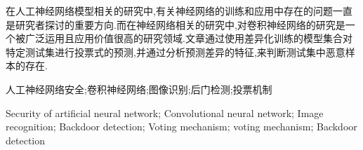 

\begin{zhaiyao}
\begin{spacing}{1.5}
{

在人工神经网络模型相关的研究中,有关神经网络的训练和应用中存在的问题一直是研究者探讨的重要方向.而在神经网络相关的研究中,对卷积神经网络的研究是一个被广泛运用且应用价值很高的研究领域.文章通过使用差异化训练的模型集合对特定测试集进行投票式的预测,并通过分析预测差异的特征,来判断测试集中恶意样本的存在.

}
\end{spacing}
\end{zhaiyao}

\begin{guanjianci}
人工神经网络安全;卷积神经网络;图像识别;后门检测;投票机制
\end{guanjianci}



\begin{abstract}
\begin{spacing}{1.5}

In the research of ANN's models, the puzzles about training and application of them are always a main direction for researchers. And in the research of DNN, CNN is a widely applied direction with high value. In this essay, via the predicting the results for test dataset by a model set which is trained with different training dataset, author can analysis the features about them and distinguish differences of malicious samples and normal samples.

\end{spacing}
\end{abstract}


\begin{keywords}
Security of artificial neural network; Convolutional neural network; Image recognition; Backdoor detection; Voting mechanism; voting mechanism; Backdoor detection
\end{keywords} 